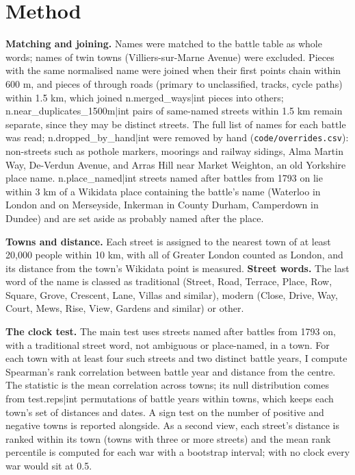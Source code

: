 \documentclass[11pt,a4paper]{article}
\begin{document}
\section{Method}
\textbf{Matching and joining.} Names were matched to the battle table as whole words; names of twin towns (Villiers-sur-Marne Avenue) were excluded. Pieces with the same normalised name were joined when their first points chain within 600 m, and pieces of through roads (primary to unclassified, tracks, cycle paths) within 1.5 km, which joined {{n.merged_ways|int}} pieces into others; {{n.near_duplicates_1500m|int}} pairs of same-named streets within 1.5 km remain separate, since they may be distinct streets. The full list of names for each battle was read; {{n.dropped_by_hand|int}} were removed by hand (\texttt{code/overrides.csv}): non-streets such as pothole markers, moorings and railway sidings, Alma Martin Way, De-Verdun Avenue, and Arras Hill near Market Weighton, an old Yorkshire place name. {{n.place_named|int}} streets named after battles from 1793 on lie within 3 km of a Wikidata place containing the battle's name (Waterloo in London and on Merseyside, Inkerman in County Durham, Camperdown in Dundee) and are set aside as probably named after the place.

\textbf{Towns and distance.} Each street is assigned to the nearest town of at least 20,000 people within 10 km, with all of Greater London counted as London, and its distance from the town's Wikidata point is measured. \textbf{Street words.} The last word of the name is classed as traditional (Street, Road, Terrace, Place, Row, Square, Grove, Crescent, Lane, Villas and similar), modern (Close, Drive, Way, Court, Mews, Rise, View, Gardens and similar) or other.

\textbf{The clock test.} The main test uses streets named after battles from 1793 on, with a traditional street word, not ambiguous or place-named, in a town. For each town with at least four such streets and two distinct battle years, I compute Spearman's rank correlation between battle year and distance from the centre. The statistic is the mean correlation across towns; its null distribution comes from {{test.reps|int}} permutations of battle years within towns, which keeps each town's set of distances and dates. A sign test on the number of positive and negative towns is reported alongside. As a second view, each street's distance is ranked within its town (towns with three or more streets) and the mean rank percentile is computed for each war with a bootstrap interval; with no clock every war would sit at 0.5.
\end{document}
